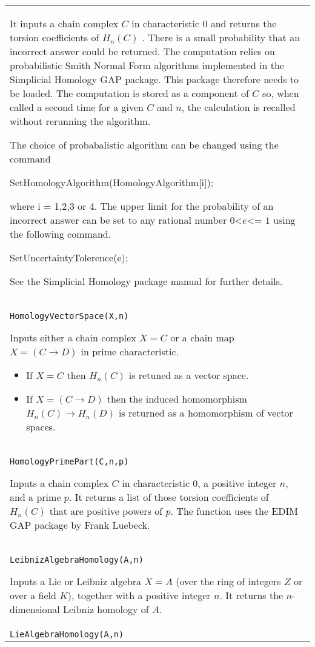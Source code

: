 \documentclass[a4paper,11pt]{report}
\begin{document}
{\begin{center}
\begin{tabular}{|l|}
 It inputs a chain complex $C$ in characteristic $0$ and returns the torsion coefficients of $H_n(C)$ . There is a small probability that an incorrect answer could be returned. The
computation relies on probabilistic Smith Normal Form algorithms implemented
in the Simplicial Homology GAP package. This package therefore needs to be
loaded. The computation is stored as a component of $C$ so, when called a second time for a given $C$ and $n$, the calculation is recalled without rerunning the algorithm. 

 The choice of probabalistic algorithm can be changed using the command 

 SetHomologyAlgorithm(HomologyAlgorithm[i]);

 where i = 1,2,3 or 4. The upper limit for the probability of an incorrect
answer can be set to any rational number $0${\textless}$e${\textless}= $1$ using the following command. 

SetUncertaintyTolerence(e);

 See the Simplicial Homology package manual for further details. \\
 \index{HomologyVectorSpace} \texttt{HomologyVectorSpace(X,n)} 

 Inputs either a chain complex $X=C$ or a chain map $X=(C \longrightarrow D)$ in prime characteristic. 
\begin{itemize}
\item If $X=C$ then $H_n(C)$ is retuned as a vector space.
\item  If $X=(C \longrightarrow D)$ then the induced homomorphism $H_n(C) \longrightarrow H_n(D)$ is returned as a homomorphism of vector spaces. 
\end{itemize}
 \\
 \index{HomologyPrimePart} \texttt{HomologyPrimePart(C,n,p)} 

 Inputs a chain complex $C$ in characteristic 0, a positive integer $n$, and a prime $p$. It returns a list of those torsion coefficients of $H_n(C)$ that are positive powers of $p$. The function uses the EDIM GAP package by Frank Luebeck. \\
 \index{LeibnizAlgebraHomology} \texttt{LeibnizAlgebraHomology(A,n)} 

 Inputs a Lie or Leibniz algebra $X=A$ (over the ring of integers $Z$ or over a field $K$), together with a positive integer $n$. It returns the $n$-dimensional Leibniz homology of $A$. \\
 \index{LieAlgebraHomology} \texttt{LieAlgebraHomology(A,n)} 


\end{tabular}
\end{center}}
\end{document}
